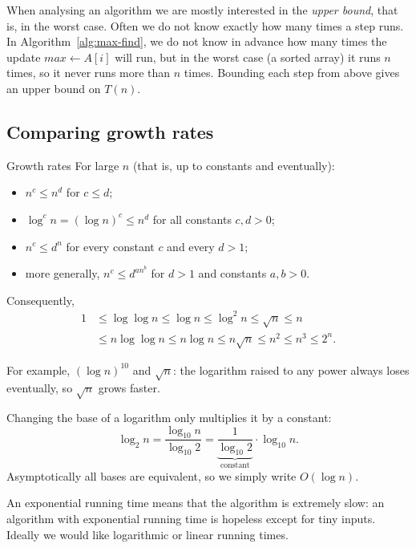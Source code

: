 \documentclass[a4paper,12pt,oneside]{report}
\begin{document}
When analysing an algorithm we are mostly interested in the
\emph{upper bound}, that is, in the worst case. Often we do not know
exactly how many times a step runs. In
Algorithm~\ref{alg:max-find}, we do not know in advance how many
times the update $\mathit{max}\gets A[i]$ will run, but in the worst
case (a sorted array) it runs $n$ times, so it never runs more than $n$
times. Bounding each step from above gives an upper bound on $T(n)$.

\subsection{Comparing growth rates}

\begin{framedprop}{Growth rates}\label{prop:growth-rates}
For large $n$ (that is, up to constants and eventually):
\begin{itemize}
  \item $n^c\leq n^d$ for $c\leq d$;
  \item $\log^c n=(\log n)^c\leq n^d$ for all constants $c,d>0$;
  \item $n^c\leq d^n$ for every constant $c$ and every $d>1$;
  \item more generally, $n^c\leq d^{an^b}$ for $d>1$ and constants
    $a,b>0$.
\end{itemize}
Consequently,
\begin{align*}
  1&\leq\log\log n\leq\log n\leq\log^2 n\leq\sqrt n\leq n\\
   &\leq n\log\log n\leq n\log n\leq n\sqrt n\leq n^2\leq n^3\leq 2^n.
\end{align*}
\end{framedprop}

For example, $(\log n)^{10}$ and $\sqrt n$: the logarithm raised to
any power always loses eventually, so $\sqrt n$ grows faster.

\begin{notebox}
Changing the base of a logarithm only multiplies it by a constant:
\[
  \log_2 n=\frac{\log_{10}n}{\log_{10}2}
          =\underbrace{\frac{1}{\log_{10}2}}_{\text{constant}}
           \cdot\log_{10}n.
\]
Asymptotically all bases are equivalent, so we simply write
$O(\log n)$.
\end{notebox}

An exponential running time means that the algorithm is extremely slow:
an algorithm with exponential running time is hopeless except for tiny
inputs. Ideally we would like logarithmic or linear running times.
\end{document}
